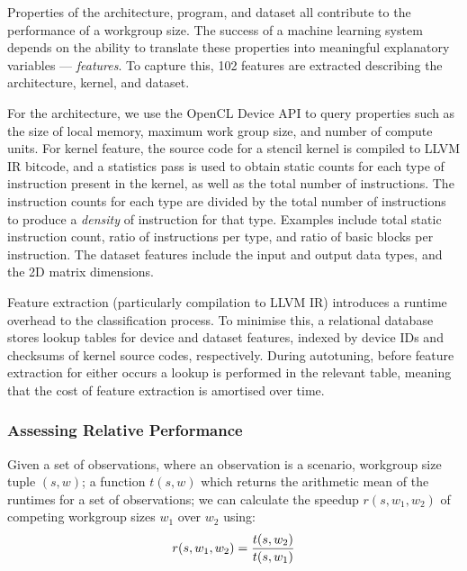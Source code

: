 \documentclass[nonatbib,preprint,10pt]{sigplanconf}
\begin{document}
Properties of the architecture, program, and dataset all contribute to
the performance of a workgroup size. The success of a machine learning
system depends on the ability to translate these properties into
meaningful explanatory variables --- \emph{features}. To capture this,
102 features are extracted describing the architecture, kernel, and
dataset.

For the architecture, we use the OpenCL Device API to query properties
such as the size of local memory, maximum work group size, and number
of compute units. For kernel feature, the source code for a stencil
kernel is compiled to LLVM IR bitcode, and a statistics pass is used
to obtain static counts for each type of instruction present in the
kernel, as well as the total number of instructions. The instruction
counts for each type are divided by the total number of instructions
to produce a \emph{density} of instruction for that type. Examples
include total static instruction count, ratio of instructions per
type, and ratio of basic blocks per instruction. The dataset features
include the input and output data types, and the 2D matrix dimensions.



Feature extraction (particularly compilation to LLVM IR) introduces a
runtime overhead to the classification process. To minimise this, a
relational database stores lookup tables for device and dataset
features, indexed by device IDs and checksums of kernel source codes,
respectively. During autotuning, before feature extraction for either
occurs a lookup is performed in the relevant table, meaning that the
cost of feature extraction is amortised over time.


\subsubsection{Assessing Relative Performance}

Given a set of observations, where an observation is a scenario,
workgroup size tuple $(s,w)$; a function $t(s,w)$ which returns the
arithmetic mean of the runtimes for a set of observations; we can
calculate the speedup $r(s, w_1, w_2)$ of competing workgroup sizes
$w_1$ over $w_2$ using:
%
\begin{equation}
  r(s, w_1, w_2) = \frac{t(s,w_2)}{t(s,w_1)}\\
\end{equation}
%
\end{document}
